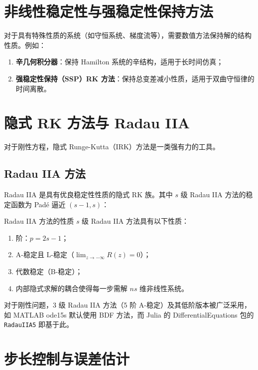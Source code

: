 \section{非线性稳定性与强稳定性保持方法}

对于具有特殊性质的系统（如守恒系统、梯度流等），需要数值方法保持解的结构性质。例如：

\begin{enumerate}
	\item \textbf{辛几何积分器}：保持 Hamilton 系统的辛结构，适用于长时间仿真；
	\item \textbf{强稳定性保持（SSP）RK 方法}：保持总变差减小性质，适用于双曲守恒律的时间离散。
\end{enumerate}

\section{隐式 RK 方法与 Radau IIA}

对于刚性方程，隐式 Runge-Kutta（IRK）方法是一类强有力的工具。

\subsection{Radau IIA 方法}

Radau IIA 是具有优良稳定性性质的隐式 RK 族。其中 $s$ 级 Radau IIA 方法的稳定函数为 Padé 逼近 $(s-1, s)$：

\begin{myTheorem}{Radau IIA 方法的性质}
	$s$ 级 Radau IIA 方法具有以下性质：
	\begin{enumerate}
		\item 阶：$p = 2s - 1$；
		\item A-稳定且 L-稳定（$\lim_{z \to -\infty} R(z) = 0$）；
		\item 代数稳定（B-稳定）；
		\item 内部隐式求解的耦合使得每一步需解 $ns$ 维非线性系统。
	\end{enumerate}
\end{myTheorem}

对于刚性问题，3 级 Radau IIA 方法（5 阶 A-稳定）及其低阶版本被广泛采用，如 MATLAB ode15s 默认使用 BDF 方法，而 Julia 的 DifferentialEquations 包的 \texttt{RadauIIA5} 即基于此。

\section{步长控制与误差估计}

